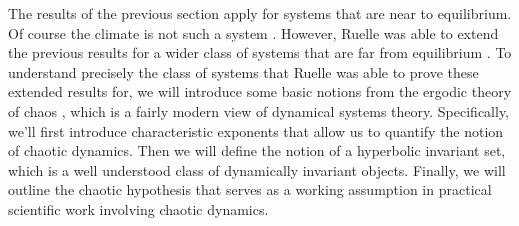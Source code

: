 The results of the previous section apply for systems that are near to equilibrium. Of course the climate is not such a system \cite{Peixoto1984}. However, Ruelle was able to extend the previous results for a wider class of systems that are far from equilibrium \cite{Ruelle}. To understand precisely the class of systems that Ruelle was able to prove these extended results for, we will introduce some basic notions from the ergodic theory of chaos \cite{Eckmann1985}, which is a fairly modern view of dynamical systems theory. Specifically, we'll first introduce characteristic exponents that allow us to quantify the notion of chaotic dynamics. Then we will define the notion of a hyperbolic invariant set, which is a well understood class of dynamically invariant objects. Finally, we will outline the chaotic hypothesis that serves as a working assumption in practical scientific work involving chaotic dynamics.  